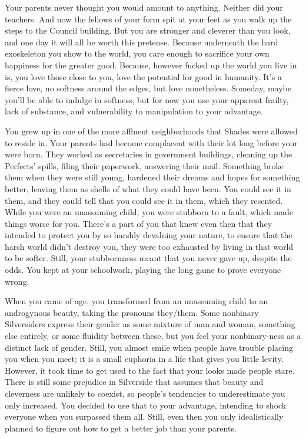 \documentclass[char]{Silversiders}
\begin{document}
\name{\cLove{}}

Your parents never thought you would amount to anything. Neither did your teachers. And now the fellows of your form spit at your feet as you walk up the steps to the Council building. But you are stronger and cleverer than you look, and one day it will all be worth this pretense. Because underneath the hard exoskeleton you show to the world, you care enough to sacrifice your own happiness for the greater good. Because, however fucked up the world you live in is, you love those close to you, love the potential for good in humanity. It's a fierce love, no softness around the edges, but love nonetheless. Someday, maybe you'll be able to indulge in softness, but for now you use your apparent frailty, lack of substance, and vulnerability to manipulation to your advantage.

You grew up in one of the more affluent neighborhoods that Shades were allowed to reside in. Your parents had become complacent with their lot long before your were born. They worked as secretaries in government buildings, cleaning up the Perfects' spills, filing their paperwork, answering their mail. Something broke them when they were still young, hardened their dreams and hopes for something better, leaving them as shells of what they could have been. You could see it in them, and they could tell that you could see it in them, which they resented. While you were an unassuming child, you were stubborn to a fault, which made things worse for you. There's a part of you that knew even then that they intended to protect you by so harshly devaluing your nature, to ensure that the harsh world didn't destroy you, they were too exhausted by living in that world to be softer. Still, your stubbornness meant that you never gave up, despite the odds. You kept at your schoolwork, playing the long game to prove everyone wrong.

When you came of age, you transformed from an unassuming child to an androgynous beauty, taking the pronouns they/them. Some nonbinary Silversiders express their gender as some mixture of man and woman, something else entirely, or some fluidity between these, but you feel your nonbinary-ness as a distinct lack of gender. Still, you almost smile when people have trouble placing you when you meet; it is a small euphoria in a life that gives you little levity. However, it took time to get used to the fact that your looks made people stare. There is still some prejudice in Silverside that assumes that beauty and cleverness are unlikely to coexist, so people's tendencies to underestimate you only increased. You decided to use that to your advantage, intending to shock everyone when you surpassed them all. Still, even then you only idealistically planned to figure out how to get a better job than your parents.
\end{document}
